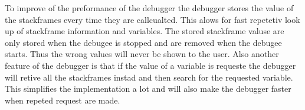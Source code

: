 To improve of the preformance of the debugger the debugger stores the value of the stackframes every time they are callcualted.
This alows for fast repetetiv look up of stackframe information and variables.
The stored stackframe valuse are only stored when the debugee is stopped and are removed when the debugee starts.
Thus the wrong values will never be shown to the user.
Also another feature of the debugger is that if the value of a variable is requeste the debugger will retive all the stackframes instad and then search for the requested variable.
This simplifies the implementation a lot and will also make the debugger faster when repeted request are made.

